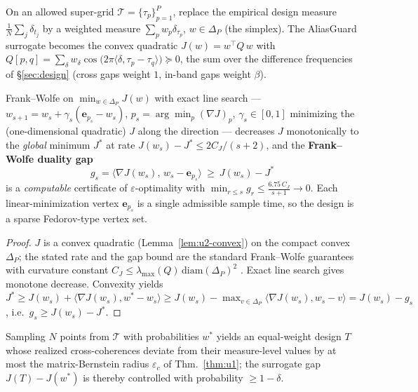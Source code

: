 \begin{lemma}\label{lem:u2-convex}
On an allowed super-grid $\mathcal T=\{\tau_p\}_{p=1}^P$, replace the empirical design measure
$\tfrac1N\sum_j\delta_{t_j}$ by a weighted measure $\sum_p w_p\delta_{\tau_p}$, $w\in\Delta_P$
(the simplex).  The AliasGuard surrogate becomes the convex quadratic $J(w)=w^{\top}Q\,w$ with
$Q[p,q]=\sum_\delta w_\delta\cos\!\big(2\pi\langle\delta,\tau_p-\tau_q\rangle\big)\succeq0$,
the sum over the difference frequencies of \S\ref{sec:design} (cross gaps weight $1$, in-band
gaps weight $\beta$).
\end{lemma}

\begin{theorem}\label{thm:u2}
Frank--Wolfe on $\min_{w\in\Delta_P}J(w)$ with exact line search --- $w_{s+1}=w_s+\gamma_s(\bm
e_{p_s}-w_s)$, $p_s=\arg\min_p(\nabla J)_p$, $\gamma_s\in[0,1]$ minimizing the (one-dimensional
quadratic) $J$ along the direction --- decreases $J$ monotonically to the \emph{global}
minimum $J^{*}$ at rate $J(w_s)-J^{*}\le 2C_J/(s+2)$, and the \textbf{Frank--Wolfe duality gap}
\[
g_s=\big\langle\nabla J(w_s),\,w_s-\bm e_{p_s}\big\rangle\ \ge\ J(w_s)-J^{*}
\]
is a \emph{computable} certificate of $\varepsilon$-optimality with $\min_{r\le s}g_r\le
\tfrac{6.75\,C_J}{s+1}\to0$.  Each linear-minimization vertex $\bm e_{p_s}$ is a single
admissible sample time, so the design is a sparse Fedorov-type vertex set.
\end{theorem}

\begin{proof}
$J$ is a convex quadratic (Lemma~\ref{lem:u2-convex}) on the compact convex $\Delta_P$; the
stated rate and the gap bound are the standard Frank--Wolfe guarantees with curvature constant
$C_J\le\lambda_{\max}(Q)\,\mathrm{diam}(\Delta_P)^2$ \cite[Thm.~1]{jaggi2013revisiting}.  Exact
line search gives monotone decrease.  Convexity yields $J^{*}\ge J(w_s)+\langle\nabla J(w_s),
w^{*}-w_s\rangle\ge J(w_s)-\max_{v\in\Delta_P}\langle\nabla J(w_s),w_s-v\rangle=J(w_s)-g_s$,
i.e.\ $g_s\ge J(w_s)-J^{*}$.
\end{proof}

\begin{corollary}\label{cor:u2-round}
Sampling $N$ points from $\mathcal T$ with probabilities $w^{*}$ yields an equal-weight design
$T$ whose realized cross-coherences deviate from their measure-level values by at most the
matrix-Bernstein radius $\varepsilon_c$ of Thm.~\ref{thm:u1}; the surrogate gap $J(T)-J(w^{*})$
is thereby controlled with probability $\ge1-\delta$.
\end{corollary}

